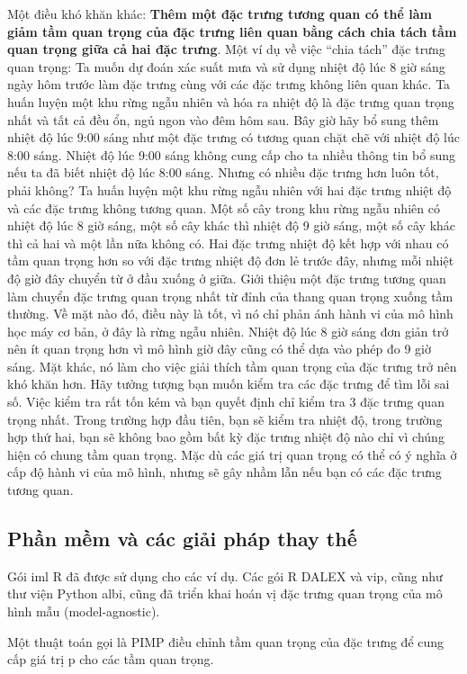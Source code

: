Một điều khó khăn khác: \textbf{Thêm một đặc trưng tương quan có thể làm giảm tầm quan trọng của đặc trưng liên quan bằng cách chia tách tầm quan trọng giữa cả hai đặc trưng}. Một ví dụ về việc  “chia tách'' đặc trưng quan trọng: Ta muốn dự đoán xác suất mưa và sử dụng nhiệt độ lúc 8 giờ sáng ngày hôm trước làm đặc trưng cùng với các đặc trưng không liên quan khác. Ta huấn luyện một khu rừng ngẫu nhiên và hóa ra nhiệt độ là đặc trưng quan trọng nhất và tất cả đều ổn, ngủ ngon vào đêm hôm sau. Bây giờ hãy bổ sung thêm nhiệt độ lúc 9:00 sáng như một đặc trưng có tương quan chặt chẽ với nhiệt độ lúc 8:00 sáng. Nhiệt độ lúc 9:00 sáng không cung cấp cho ta nhiều thông tin bổ sung nếu ta đã biết nhiệt độ lúc 8:00 sáng. Nhưng có nhiều đặc trưng hơn luôn tốt, phải không? Ta huấn luyện một khu rừng ngẫu nhiên với hai đặc trưng nhiệt độ và các đặc trưng không tương quan. Một số cây trong khu rừng ngẫu nhiên có nhiệt độ lúc 8 giờ sáng, một số cây khác thì nhiệt độ 9 giờ sáng, một số cây khác thì cả hai và một lần nữa không có. Hai đặc trưng nhiệt độ kết hợp với nhau có tầm quan trọng hơn so với đặc trưng nhiệt độ đơn lẻ trước đây, nhưng mỗi nhiệt độ giờ đây chuyển từ ở đầu xuống ở giữa. Giới thiệu một đặc trưng tương quan làm chuyển đặc trưng quan trọng nhất từ đỉnh của thang quan trọng xuống tầm thường. Về mặt nào đó, điều này là tốt, vì nó chỉ phản ánh hành vi của mô hình học máy cơ bản, ở đây là rừng ngẫu nhiên. Nhiệt độ lúc 8 giờ sáng đơn giản trở nên ít quan trọng hơn vì mô hình giờ đây cũng có thể dựa vào phép đo 9 giờ sáng. Mặt khác, nó làm cho việc giải thích tầm quan trọng của đặc trưng trở nên khó khăn hơn. Hãy tưởng tượng bạn muốn kiểm tra các đặc trưng để tìm lỗi sai số. Việc kiểm tra rất tốn kém và bạn quyết định chỉ kiểm tra 3 đặc trưng quan trọng nhất. Trong trường hợp đầu tiên, bạn sẽ kiểm tra nhiệt độ, trong trường hợp thứ hai, bạn sẽ không bao gồm bất kỳ đặc trưng nhiệt độ nào chỉ vì chúng hiện có chung tầm quan trọng. Mặc dù các giá trị quan trọng có thể có ý nghĩa ở cấp độ hành vi của mô hình, nhưng sẽ gây nhầm lẫn nếu bạn có các đặc trưng tương quan.\\
\subsection{Phần mềm và các giải pháp thay thế}
Gói iml R đã được sử dụng cho các ví dụ. Các gói R DALEX và vip, cũng như thư viện Python albi, cũng đã triển khai hoán vị đặc trưng quan trọng của mô hình mẫu (model-agnostic).

Một thuật toán gọi là PIMP điều chỉnh tầm quan trọng của đặc trưng để cung cấp giá trị p cho các tầm quan trọng.

